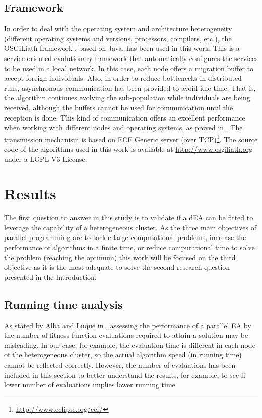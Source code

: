 \documentclass[final,1p,times]{elsarticle}
\begin{document}
\subsection{Framework}
In order to deal with the operating system and architecture heterogeneity (different operating systems and versions, processors, compilers, etc.), the OSGiLiath framework \cite{SOASOCO}, based on Java, has been used in this work. This is a service-oriented evolutionary framework that automatically configures the services to be used in a local network. In this case, each node offers a migration buffer to accept foreign individuals. Also, in order to reduce bottlenecks in distributed runs, asynchronous communication has been provided to avoid idle time. That is, the algorithm continues evolving the sub-population while individuals are being received, although the buffers cannot be used for communication until the reception is done. This kind of communication offers an excellent performance when working with different nodes and operating systems, as proved in \cite{HETEROGENEOUSHARD,AsynchronousMerelo08}. The transmission mechanism is based on ECF Generic server (over TCP)\footnote{\url{http://www.eclipse.org/ecf/}}.  The source code of the algorithms used in this work is available at \url{http://www.osgiliath.org} under a LGPL V3 License. 


\section{Results}
\label{sec:results}



The first question to answer in this study is to validate if a dEA can 
be fitted to leverage the capability of a heterogeneous cluster. 
As the three main objectives of parallel programming are to tackle large
computational problems, increase the performance of algorithms in a
finite time, or reduce computational time to solve the problem
(reaching the optimum) \cite{EVALUATIONPARALLEL}  this work will be
focused on the third objective as it is the most adequate to solve the second research question presented in the Introduction. 


\subsection{Running time analysis}

As stated by Alba and Luque in \cite{EVALUATIONPARALLEL}, assessing
the performance of a parallel EA by the number of fitness function
evaluations required to attain a solution may be misleading. In our
case, for example, the evaluation time is different in each node of
the heterogeneous cluster, so the actual algorithm speed (in running
time) cannot be reflected correctly. However, the number of
evaluations has been included in this section to better understand the
results, for example, to see if lower number of evaluations implies lower running time. 
\end{document}
